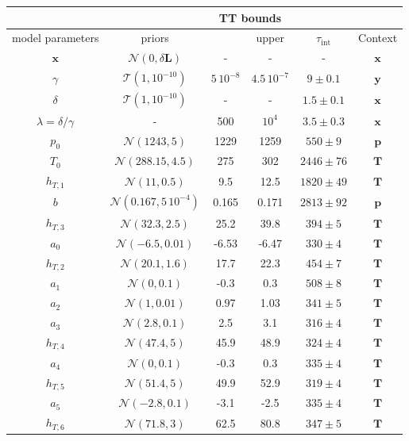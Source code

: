 \begin{table}
	\centering
	\begin{tabular}{ |c||c|c|c|c|c|   }
		\hline
		& &\multicolumn{2}{|c|}{TT bounds}& &\\
		\hline
		model parameters& priors&\makecell{lower}& \makecell{upper\\
		}&$\tau_{\text{int}}$&Context\\
		\hhline{|=||=|=|=|=|=|}
		$\bm{x}$ &$\mathcal{N}(0,\delta \bm{L})$ & -&-&-& $\bm{x}$\\ \hline
		$\gamma$ & $\mathcal{T}(1,10^{-10})$ &$5 \, 10^{-8}$ &$4.5 \, 10^{-7}$&  $ 9\pm 0.1$ &$\bm{y}$\\ \hline
		$\delta$ &$\mathcal{T}(1,10^{-10})$ & -&-& $1.5 \pm 0.1$ & $\bm{x}$\\ \hline
		$\lambda  = \delta / \gamma$ &- & 500&$10^4$& $3.5 \pm 0.3$ &$\bm{x}$\\ \hline
		$p_0$ &  $\mathcal{N}(1243,5)$&1229 &1259&$550 \pm 9$&$\bm{p}$\\ \hline
		$T_{0}$ &  $\mathcal{N}(288.15,4.5)$& 275 &302&$2446 \pm 76$&$\bm{T}$\\ \hline
		$h_{T,1}$ &  $\mathcal{N}(11,0.5)$&9.5 &12.5&$1820 \pm 49$ &$\bm{T}$\\ \hline
		$b$ &  $\mathcal{N}(0.167,5\,10^{-4})$& 0.165& 0.171 &$2813 \pm 92$&$\bm{p}$\\ \hline
		$h_{T,3}$ &  $\mathcal{N}(32.3,2.5)$&25.2&39.8&$394 \pm 5$&$\bm{T}$\\ \hline
		$a_{0}$ &  $\mathcal{N}(-6.5,0.01)$&-6.53 &-6.47&$330 \pm 4$&$\bm{T}$\\ \hline
		$h_{T,2}$ &  $\mathcal{N}(20.1,1.6)$&17.7 &22.3&$454 \pm 7$&$\bm{T}$\\ \hline
		$a_{1}$ &  $\mathcal{N}(0,0.1)$&-0.3 &0.3&$508 \pm 8$&$\bm{T}$\\ \hline
		$a_{2}$ &  $\mathcal{N}(1,0.01)$&0.97 &1.03&$341 \pm 5$&$\bm{T}$\\ \hline
		$a_{3}$ &  $\mathcal{N}(2.8,0.1)$&2.5 &3.1&$316 \pm 4$&$\bm{T}$\\ \hline
		$h_{T,4}$ &  $\mathcal{N}(47.4,5)$&45.9 &48.9&$324 \pm 4$&$\bm{T}$\\ \hline
		$a_{4}$ &  $\mathcal{N}(0,0.1)$&-0.3 &0.3&$335 \pm 4$&$\bm{T}$\\ \hline
		$h_{T,5}$ &  $\mathcal{N}(51.4,5)$&49.9 &52.9&$319 \pm 4$&$\bm{T}$\\ \hline
		$a_{5}$ &  $\mathcal{N}(-2.8,0.1)$&-3.1 &-2.5&$335 \pm 4$&$\bm{T}$\\ \hline
		$h_{T,6}$ &  $\mathcal{N}(71.8,3)$&62.5 &80.8&$347 \pm 5$&$\bm{T}$\\ \hline

\end{tabular}
\end{table}
